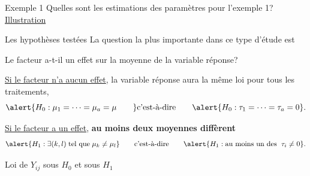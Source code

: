 \documentclass{BeamerTemplate}
\begin{document}
\begin{frame}[t]{Exemple 1}
Quelles sont les estimations des paramètres pour l'exemple 1? \href{https://jmiron-anovapara.share.connect.posit.cloud/}{Illustration}
\end{frame}


\begin{frame}[t]{Les hypothèses testées}
La question la plus importante dans ce type d'étude est\\
 \centerline{\alert{Le facteur a-t-il un effet sur la moyenne de la variable réponse?}}

\medskip
\underline{Si le facteur n'a aucun effet}, la variable réponse aura la même loi pour tous les traitements, 
$$\alert{H_0:\mu_1=\cdots=\mu_a=\mu\qquad}\text{c'est-à-dire}\qquad\alert{H_0:\tau_1=\cdots=\tau_a=0}.$$

\medskip
\underline{Si le facteur a un effet}, \textbf{au moins deux moyennes diffèrent} \\
$$\alert{H_1:\exists (k,l)\; \text{tel que}\; \mu_k\ne\mu_l } \qquad \text{c'est-à-dire}  \qquad \alert{H_1:\text{au moins un des }\;\tau_i\ne0}.$$
\end{frame}

\begin{frame}{Loi de $Y_{ij}$ sous $H_0$ et sous $H_1$}
\end{frame}

\end{document}
